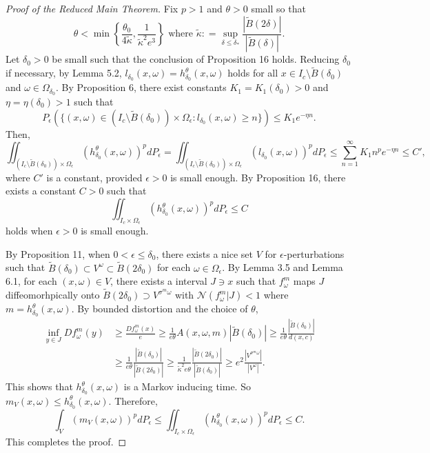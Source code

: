 \documentclass[11pt,oneside]{article}
\theoremstyle{plain}
\numberwithin{equation}{section}
\numberwithin{figure}{section}
\numberwithin{table}{section}
\begin{document}
\begin{proof}[Proof of the Reduced Main Theorem]

Fix $p>1$ and $\theta > 0$ small so that
\[
\theta < \min\left\{ \frac{\theta_0}{4\tilde \kappa}, \frac{1}{\tilde \kappa^2 e^3} \right\} \mbox{ where \ } \tilde \kappa : = \sup_{\delta \leq \delta_*} \frac{|\tilde B(2\delta)|}{|\tilde B(\delta)|}.
\] 
Let $\delta_0 > 0$ be small such that the conclusion of Proposition 16 holds. Reducing $\delta_0$ if necessary, by Lemma 5.2, $l_{\delta_0} (x, \omega) = h_{\delta_0}^{\theta} (x, \omega)$ holds for all $x \in I_c \setminus \tilde B(\delta_0)$ and $\omega \in \Omega_{\delta_0}$. By Proposition 6, there exist constants $K_1 = K_1(\delta_0)> 0$ and $\eta = \eta(\delta_0) > 1$ such that 
\[
P_{\epsilon} (\{ (x, \omega) \in (I_c \setminus \tilde B(\delta_0)) \times \Omega_{\epsilon}: l_{\delta_0}(x, \omega) \geq n \}) \leq K_1 e^{-\eta n}.
\]
Then,
\[
\iint_{ (I_c \setminus \tilde B(\delta_0)) \times \Omega_{\epsilon}} (h_{\delta_0}^{\theta} (x, \omega))^p d P_{\epsilon} = \iint_{ (I_c \setminus \tilde B(\delta_0)) \times \Omega_{\epsilon}} (l_{\delta_0} (x, \omega))^p d P_{\epsilon} \leq \sum_{n=1}^{\infty} K_1 n^p  e^{-\eta n} \leq C',
\]
where $C'$ is a constant, provided $\epsilon > 0$ is small enough. By Proposition 16, there exists a constant $C>0$ such that 
\[
\iint_{ I_c  \times \Omega_{\epsilon}} (h_{\delta_0}^{\theta} (x, \omega))^p d P_{\epsilon}  \leq C
\]
holds when $\epsilon > 0$ is small enough.


By Proposition 11, when $0 < \epsilon \leq \delta_0$, there exists a nice set $V$ for $\epsilon$-perturbations such that $\tilde B(\delta_0) \subset V^{\omega} \subset \tilde B( 2\delta_0) $ for each $\omega \in \Omega_{\epsilon}$. By Lemma 3.5 and Lemma 6.1, for each $(x, \omega) \in V$, there exists a interval $J \ni x$ such that  $f_{\omega}^m$ maps $J$ diffeomorhpically onto $\tilde B(2\delta_0) \supset V^{\sigma^m \omega}$ with $\mathcal N(f_{\omega}^m |J)< 1$ where $m =h_{\delta_0}^{\theta} (x, \omega)$. By bounded distortion and the choice of $\theta$, 
\begin{align*}
\inf_{y \in J} Df_{\omega}^m(y) & \geq \frac{Df_{\omega}^m(x) }{e} \geq \frac{1}{e \theta} A(x, \omega, m) |\tilde B(\delta_0)|   \geq \frac{1}{e \theta} \frac{|\tilde B(\delta_0)|}{d(x, c)} \\
& \geq \frac{1}{e\theta} \frac{|\tilde B(\delta_0)|}{|\tilde B(2\delta_0)|}  \geq \frac{1}{\tilde \kappa^2 e\theta} \frac{|\tilde B(2\delta_0)|}{|\tilde B(\delta_0)|} \geq e^2 \frac{|V^{\sigma^m \omega}|}{|V^{\omega}|}.
\end{align*}
This shows that $h_{\delta_0}^{\theta} (x, \omega)$ is a Markov inducing time. So $m_V(x, \omega) \leq h_{\delta_0}^{\theta} (x, \omega)$. Therefore,
\[
\int_V (m_V(x, \omega))^p dP_{\epsilon} \leq \iint_{ I_c  \times \Omega_{\epsilon}} (h_{\delta_0}^{\theta} (x, \omega))^p d P_{\epsilon}  \leq C.
\]
This completes the proof.


\end{proof}
\end{document}

